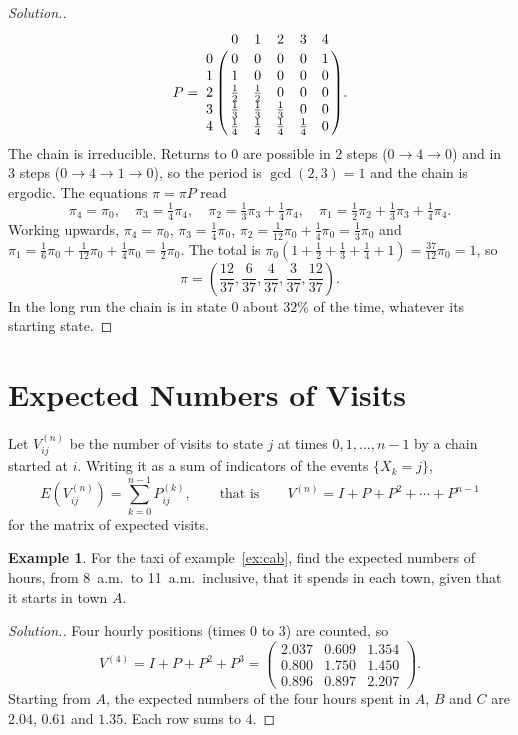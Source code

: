 \documentclass[12pt,a4paper]{report}
\theoremstyle{definition}
\newtheorem{exa}[thm]{Example}
\newenvironment{solution}
  {\renewcommand{\qedsymbol}{}\begin{proof}[\textit{Solution}.]}
  {\end{proof}}
\begin{document}
\begin{solution}
\[P = \bordermatrix{~ & 0 & 1 & 2 & 3 & 4\cr
0 & 0 & 0 & 0 & 0 & 1\cr
1 & 1 & 0 & 0 & 0 & 0\cr
2 & \frac12 & \frac12 & 0 & 0 & 0\cr
3 & \frac13 & \frac13 & \frac13 & 0 & 0\cr
4 & \frac14 & \frac14 & \frac14 & \frac14 & 0\cr} .\]
The chain is irreducible. Returns to $0$ are possible in $2$ steps ($0\to 4\to 0$) and in $3$
steps ($0\to 4\to 1\to 0$), so the period is $\gcd(2, 3) = 1$ and the chain is ergodic. The
equations $\pi = \pi P$ read
\[\pi_4 = \pi_0,\quad \pi_3 = \tfrac14\pi_4,\quad \pi_2 = \tfrac13\pi_3 + \tfrac14\pi_4,\quad
\pi_1 = \tfrac12\pi_2 + \tfrac13\pi_3 + \tfrac14\pi_4 .\]
Working upwards, $\pi_4 = \pi_0$, $\pi_3 = \frac14\pi_0$, $\pi_2 = \frac{1}{12}\pi_0 + \frac14\pi_0 = \frac13\pi_0$ and
$\pi_1 = \frac16\pi_0 + \frac{1}{12}\pi_0 + \frac14\pi_0 = \frac12\pi_0$. The total is
$\pi_0\left(1 + \frac12 + \frac13 + \frac14 + 1\right) = \frac{37}{12}\pi_0 = 1$, so
\[\pi = \left(\frac{12}{37}, \frac{6}{37}, \frac{4}{37}, \frac{3}{37}, \frac{12}{37}\right).\]
In the long run the chain is in state $0$ about $32\%$ of the time, whatever its starting state.
\end{solution}

\section{Expected Numbers of Visits}

Let $V_{ij}^{(n)}$ be the number of visits to state $j$ at times $0, 1, \dots, n - 1$ by a chain
started at $i$. Writing it as a sum of indicators of the events $\{X_k = j\}$,
\[E\left(V_{ij}^{(n)}\right) = \sum_{k=0}^{n - 1}P_{ij}^{(k)},\qquad\text{that is}\qquad
V^{(n)} = I + P + P^2 + \cdots + P^{n - 1}\]
for the matrix of expected visits.

\begin{exa}
\label{ex:cabvisits}
For the taxi of example~\ref{ex:cab}, find the expected numbers of hours, from 8~a.m.\ to
11~a.m.\ inclusive, that it spends in each town, given that it starts in town $A$.
\end{exa}

\begin{solution}
Four hourly positions (times $0$ to $3$) are counted, so
\[V^{(4)} = I + P + P^2 + P^3 = \begin{pmatrix}2.037 & 0.609 & 1.354\\ 0.800 & 1.750 & 1.450\\ 0.896 & 0.897 & 2.207\end{pmatrix}.\]
Starting from $A$, the expected numbers of the four hours spent in $A$, $B$ and $C$ are
$2.04$, $0.61$ and $1.35$. Each row sums to $4$.
\end{solution}
\end{document}
